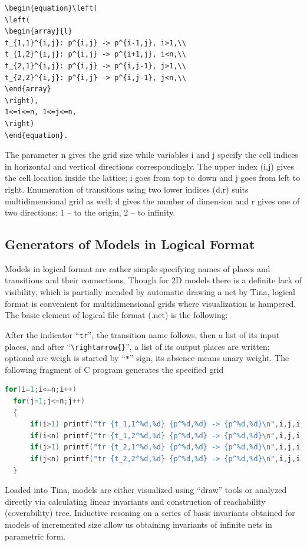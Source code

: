\documentclass[10pt, a5paper]{article}
\begin{document}
\begin{verbatim}
\begin{equation}\left(
\left(
\begin{array}{l}
t_{1,1}^{i,j}: p^{i,j} -> p^{i-1,j}, i>1,\\
t_{1,2}^{i,j}: p^{i,j} -> p^{i+1,j}, i<n,\\
t_{2,1}^{i,j}: p^{i,j} -> p^{i,j-1}, j>1,\\
t_{2,2}^{i,j}: p^{i,j} -> p^{i,j-1}, j<n,\\
\end{array}
\right),
1<=i<=n, 1<=j<=n, 
\right)
\end{equation}.\end{verbatim}
The parameter n gives the grid size while variables i and j specify the cell indices in horizontal and vertical directions correspondingly. The upper index (i,j) gives the cell location inside the lattice; i goes from top to down and j goes from left to right. Enumeration of transitions using two lower indices (d,r) suits multidimensional grid as well; d gives the number of dimension and r gives one of two directions: 1 -- to the origin, 2 -- to infinity.

\subsection*{Generators of Models in Logical Format}

Models in logical format are rather simple specifying names of places and transitions and their connections. Though for 2D models there is a definite lack of visibility, which is partially mended by automatic drawing a net by Tina, logical format is convenient for multidimensional grids where visualization is hampered.  The basic element of logical file format (.net) is the following:


After the indicator “\verb!tr!”, the transition name follows, then a list of its input places, and after “\verb!\rightarrow{}!”, a list of its output places are written; optional arc weigh is started by “\verb!*!” sign, its absence means unary weight.  
The following fragment of C program generates the specified grid

\begin{lstlisting}[language=C]
for(i=1;i<=n;i++)
  for(j=1;j<=n;j++)
  {
      if(i>1) printf("tr {t_1,1^%d,%d} {p^%d,%d} -> {p^%d,%d}\n",i,j,i,j,i-1,j);
      if(i<n) printf("tr {t_1,2^%d,%d} {p^%d,%d} -> {p^%d,%d}\n",i,j,i,j,i+1,j);
      if(j>1) printf("tr {t_2,1^%d,%d} {p^%d,%d} -> {p^%d,%d}\n",i,j,i,j,i,j-1);
      if(j<n) printf("tr {t_2,2^%d,%d} {p^%d,%d} -> {p^%d,%d}\n",i,j,i,j,i,j+1);
  }\end{lstlisting}
Loaded into Tina, models are either visualized using “draw” tools or analyzed directly via calculating linear invariants and construction of reachability (coverability) tree. Inductive resoning on a series of basis invariants obtained for models of incremented size allow us obtaining invariants of infinite nets in parametric form.
\end{document}
